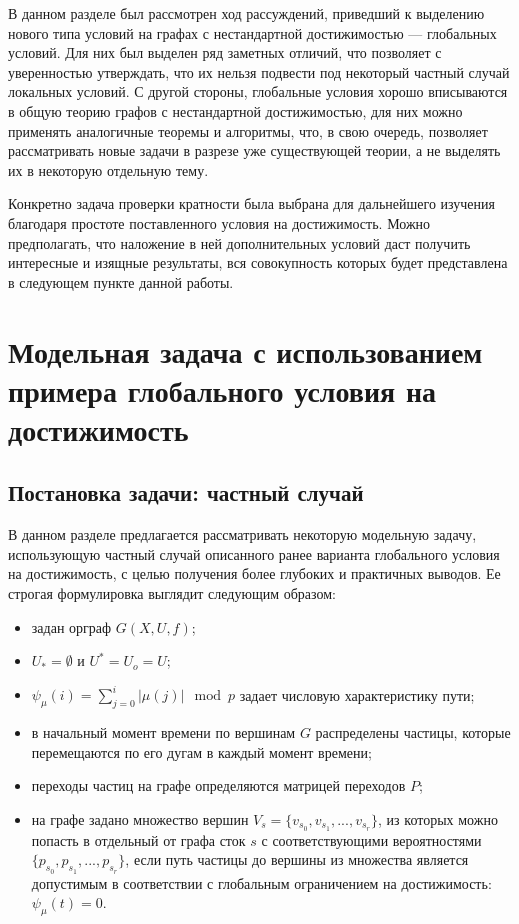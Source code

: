 	В данном разделе был рассмотрен ход рассуждений, приведший к выделению нового типа условий на графах с нестандартной достижимостью --- глобальных условий. Для них был выделен ряд заметных отличий, что позволяет с уверенностью утверждать, что их нельзя подвести под некоторый частный случай локальных условий. С другой стороны, глобальные условия хорошо вписываются в общую теорию графов с нестандартной достижимостью, для них можно применять аналогичные теоремы и алгоритмы, что, в свою очередь, позволяет рассматривать новые задачи в разрезе уже существующей теории, а не выделять их в некоторую отдельную тему. 
	
	Конкретно задача проверки кратности была выбрана для дальнейшего изучения благодаря простоте поставленного условия на достижимость. Можно предполагать, что наложение в ней дополнительных условий даст получить интересные и изящные результаты, вся совокупность которых будет представлена в следующем пункте данной работы. 
	
	\chapter{Модельная задача с использованием примера глобального условия на достижимость}
	
	\section{Постановка задачи: частный случай}
	
	В данном разделе предлагается рассматривать некоторую модельную задачу, использующую частный случай описанного ранее варианта глобального условия на достижимость, с целью получения более глубоких и практичных выводов. Ее строгая формулировка выглядит следующим образом:
	
	\begin{itemize}
		\item задан орграф $G(X,U,f)$;
		\item $U_* = \emptyset$ и $U^* = U_o = U$;
		\item $\psi_\mu(i) = \sum_{j=0}^i | \mu(j)|\mod p$ задает числовую характеристику пути; 
		\item в начальный момент времени по вершинам $G$ распределены частицы, которые перемещаются по его дугам в каждый момент времени;
		\item переходы частиц на графе определяются матрицей переходов $P$;
		\item на графе задано множество вершин $V_s = \{v_{s_0}, v_{s_1}, ... , v_{s_r}\}$, из которых можно попасть в отдельный от графа сток $s$ с соответствующими вероятностями $\{p_{s_0}, p_{s_1}, ... , p_{s_r}\}$, если путь частицы до вершины из множества является допустимым в соответствии с глобальным ограничением на достижимость: $\psi_\mu(t) = 0$.
	\end{itemize}

